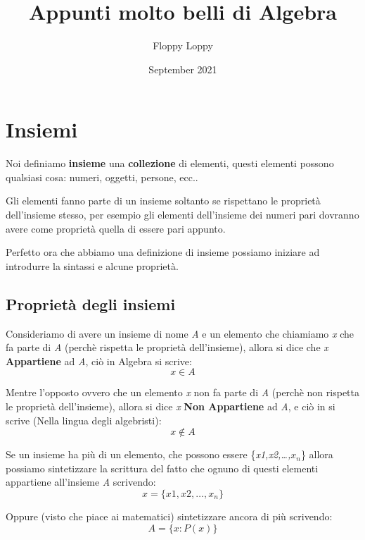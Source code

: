 \documentclass{article}
\begin{document}
\title{Appunti molto belli di Algebra}
\author{Floppy Loppy}
\date{September 2021}
\maketitle
\tableofcontents
\newpage



\section{Insiemi}
Noi definiamo \textbf{insieme} una \textbf{collezione} di elementi, questi elementi possono qualsiasi cosa: numeri, oggetti, persone, ecc.. \par
Gli elementi fanno parte di un insieme soltanto se rispettano le proprietà dell'insieme stesso, per esempio gli elementi dell'insieme dei numeri pari dovranno avere come proprietà quella di essere pari appunto. \par
Perfetto ora che abbiamo una definizione di insieme possiamo iniziare ad introdurre la sintassi e alcune proprietà.

\subsection{Proprietà degli insiemi}
Consideriamo di avere un insieme di nome \textit{A} e un elemento che chiamiamo \textit{x} che fa parte di \textit{A} (perchè rispetta le proprietà dell'insieme), allora si dice che \textit{x} \textbf{Appartiene} ad \textit{A}, ciò in Algebra si scrive:
\begin{equation}
        x \in A
\end{equation}

Mentre l'opposto ovvero che un elemento \textit{x} non fa parte di \textit{A} (perchè non rispetta le proprietà dell'insieme), allora si dice \textit{x} \textbf{Non Appartiene} ad \textit{A}, e ciò in si scrive (Nella lingua degli algebristi):
\begin{equation}
        x \not \in A
\end{equation}

Se un insieme ha più di un elemento, che possono essere \{\textit{x1,x2,\ldots,$x_n$}\} allora possiamo sintetizzare la scrittura del fatto che ognuno di questi elementi appartiene all'insieme \textit{A} scrivendo:
\begin{equation}
        x = \{x1,x2,\ldots,x_n\} 
\end{equation}

Oppure (visto che piace ai matematici) sintetizzare ancora di più scrivendo:
\begin{equation}
        A = \{x : P(x)\}
\end{equation}
\end{document}
